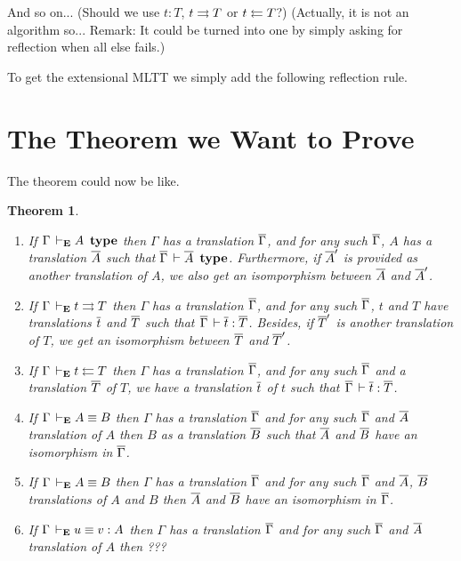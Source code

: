 \documentclass{amsart}
\newtheorem{theorem}{Theorem}[section]
\begin{document}
\begin{mathc}
\end{mathc}

\begin{mathc}
\end{mathc}
%
And so on... (Should we use $t : T$, $t \rightrightarrows T$ or $t \leftleftarrows T$?)
(Actually, it is not an algorithm so... Remark: It could be turned into one
by simply asking for reflection when all else fails.)

To get the extensional MLTT we simply add the following reflection rule.
%
\begin{mathc}
\end{mathc}


\section{The Theorem we Want to Prove}

The theorem could now be like.

\begin{theorem}
  \leavevmode
  \begin{enumerate}
    \item If $\Gamma \,\vdash_\mathbf{E} A\ \operatorname{\mathbf{type}}$ then $\Gamma$ has a translation $\overline{\Gamma}$,
    and for any such $\overline{\Gamma}$, $A$ has a translation $\overline{A}$ such that
    $\overline{\Gamma} \,\vdash \overline{A}\ \operatorname{\mathbf{type}}$. Furthermore, if $\overline{A}'$ is provided as another
    translation of $A$, we also get an isomporphism between $\overline{A}$ and
    $\overline{A}'$.
    \item If $\Gamma \,\vdash_\mathbf{E} t \rightrightarrows T$ then $\Gamma$ has a translation $\overline{\Gamma}$,
    and for any such $\overline{\Gamma}$, $t$ and $T$ have translations $\overline{t}$ and $\overline{T}$
    such that $\overline{\Gamma} \,\vdash \overline{t} : \overline{T}$. Besides, if $\overline{T}'$ is another
    translation of $T$, we get an isomorphism between $\overline{T}$ and $\overline{T}'$.
    \item If $\Gamma \,\vdash_\mathbf{E} t \leftleftarrows T$ then $\Gamma$ has a translation $\overline{\Gamma}$,
    and for any such $\overline{\Gamma}$ and a translation $\overline{T}$ of $T$, we have a
    translation $\overline{t}$ of $t$ such that $\overline{\Gamma} \,\vdash \overline{t} : \overline{T}$.
    \item If $\Gamma \,\vdash_\mathbf{E} A \equiv B$ then $\Gamma$ has a translation $\overline{\Gamma}$
    and for any such $\overline{\Gamma}$ and $\overline{A}$ translation of $A$ then $B$ as a
    translation $\overline{B}$ such that $\overline{A}$ and $\overline{B}$ have an isomorphism in
    $\overline{\Gamma}$.
    \item If $\Gamma \,\vdash_\mathbf{E} A \equiv B$ then $\Gamma$ has a translation $\overline{\Gamma}$
    and for any such $\overline{\Gamma}$ and $\overline{A}$, $\overline{B}$ translations of $A$ and $B$
    then $\overline{A}$ and $\overline{B}$ have an isomorphism in $\overline{\Gamma}$.
    \item  If $\Gamma \,\vdash_\mathbf{E} u \equiv v : A$ then $\Gamma$ has a translation
    $\overline{\Gamma}$ and for any such $\overline{\Gamma}$ and $\overline{A}$ translation of $A$ then ???
  \end{enumerate}
\end{theorem}
\end{document}
